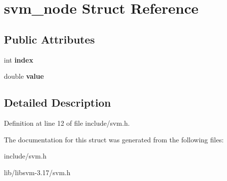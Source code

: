 \hypertarget{structsvm__node}{
\section{svm\_\-node Struct Reference}
\label{structsvm__node}
}
\subsection*{Public Attributes}
\begin{DoxyCompactItemize}
\item 
\hypertarget{structsvm__node_aa733ca75ee5a5c0f36af5ddb4c6394d9}{
int {\bfseries index}}
\label{structsvm__node_aa733ca75ee5a5c0f36af5ddb4c6394d9}

\item 
\hypertarget{structsvm__node_a9ca47b8a156238d04213453f3b89e177}{
double {\bfseries value}}
\label{structsvm__node_a9ca47b8a156238d04213453f3b89e177}

\end{DoxyCompactItemize}


\subsection{Detailed Description}


Definition at line 12 of file include/svm.h.



The documentation for this struct was generated from the following files:\begin{DoxyCompactItemize}
\item 
include/svm.h\item 
lib/libsvm-\/3.17/svm.h\end{DoxyCompactItemize}
